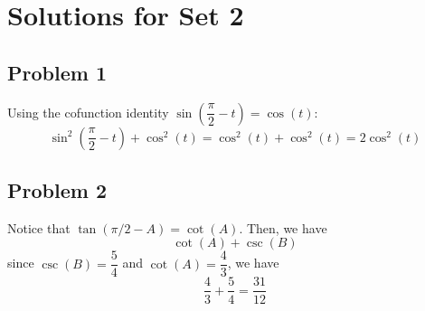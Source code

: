 \documentclass[12pt]{article}
\begin{document}
\section*{Solutions for Set 2}
\subsection*{Problem 1}
Using the cofunction identity \(\sin\left(\dfrac{\pi}{2} - t\right) = \cos(t)\):
\[
\sin^2\left(\dfrac{\pi}{2} - t\right) + \cos^2(t) = \cos^2(t) + \cos^2(t) = 2\cos^2(t)
\]

\subsection*{Problem 2}
Notice that \(\tan(\pi/2-A)=\cot(A)\). Then, we have
\[\cot(A)+\csc(B)\]
since \(\csc(B)=\dfrac{5}{4}\) and \(\cot(A)=\dfrac{4}{3}\), we have
\[\dfrac{4}{3}+\dfrac{5}{4}=\dfrac{31}{12}\]
\end{document}
